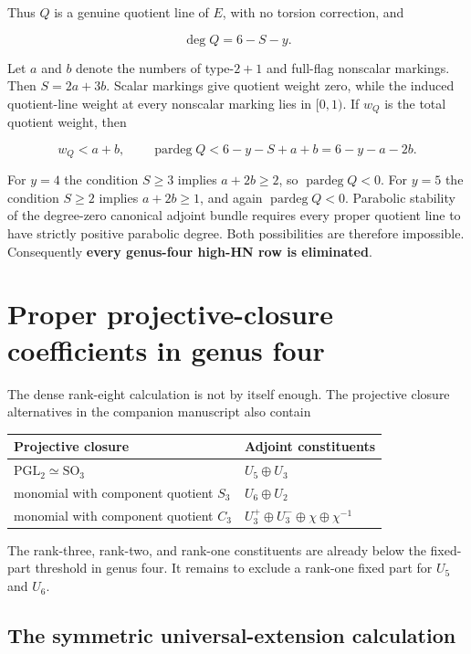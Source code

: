 \documentclass[11pt]{article}
\theoremstyle{definition}
\begin{document}
Thus \(Q\) is a genuine quotient line of \(E\), with no torsion
correction, and

\[\deg Q=6-S-y.\]

Let \(a\) and \(b\) denote the numbers of type-\(2+1\) and full-flag
nonscalar markings. Then \(S=2a+3b\). Scalar markings give quotient
weight zero, while the induced quotient-line weight at every nonscalar
marking lies in \([0,1)\). If \(w_Q\) is the total quotient weight, then

\[w_Q<a+b,
\qquad
\operatorname{pardeg}Q
<6-y-S+a+b=6-y-a-2b.\]

For \(y=4\) the condition \(S\ge3\) implies \(a+2b\ge2\), so
\(\operatorname{pardeg}Q<0\). For \(y=5\) the condition \(S\ge2\)
implies \(a+2b\ge1\), and again \(\operatorname{pardeg}Q<0\). Parabolic
stability of the degree-zero canonical adjoint bundle requires every
proper quotient line to have strictly positive parabolic degree. Both
possibilities are therefore impossible. Consequently \textbf{every
genus-four high-HN row is eliminated}.

\section{Proper projective-closure coefficients in genus
four}\label{proper-projective-closure-coefficients-in-genus-four}

The dense rank-eight calculation is not by itself enough. The projective
closure alternatives in the companion manuscript \cite{SneidermanG5} also
contain

\begin{longtable}[]{@{}ll@{}}
\toprule\noalign{}
Projective closure & Adjoint constituents \\
\midrule\noalign{}
\endhead
\bottomrule\noalign{}
\endlastfoot
\(\mathrm{PGL}_2\simeq\mathrm{SO}_3\) & \(U_5\oplus U_3\) \\
monomial with component quotient \(S_3\) & \(U_6\oplus U_2\) \\
monomial with component quotient \(C_3\) &
\(U_3^+\oplus U_3^-\oplus\chi\oplus\chi^{-1}\) \\
\end{longtable}

The rank-three, rank-two, and rank-one constituents are already below
the fixed-part threshold in genus four. It remains to exclude a rank-one
fixed part for \(U_5\) and \(U_6\).

\subsection{The symmetric universal-extension
calculation}\label{the-symmetric-universal-extension-calculation}
\end{document}
